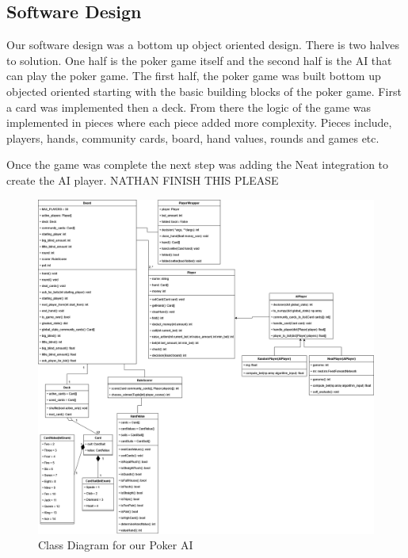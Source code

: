 \subsection{Software Design}
Our software design was a bottom up object oriented design. There is two halves to solution. One half is the poker game itself and the second half is the AI that can play the poker game. The first half, the poker game was built bottom up objected oriented starting with the basic building blocks of the poker game. First a card was implemented then a deck. From there the logic of the game was implemented in pieces where each piece added more complexity. Pieces include, players, hands, community cards, board, hand values, rounds and games etc. 

Once the game was complete the next step was adding the Neat integration to create the AI player. NATHAN FINISH THIS PLEASE

\clearpage
\begin{figure}[H]
    \centering
    \includegraphics[scale=0.4]{resources/Poker_AI_-Class_Diagram.drawio.png}
    \caption{Class Diagram for our Poker AI}
    \label{fig:classDiagram}
\end{figure}



